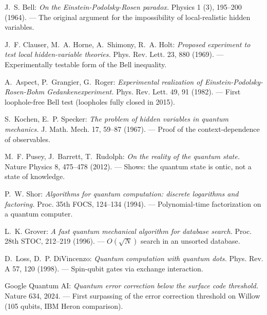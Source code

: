 \begin{description}[leftmargin=3.5em,style=sameline,itemsep=0.4em]\small

\item[Bell 1964] J.~S. Bell: \textit{On the Einstein-Podolsky-Rosen
  paradox.} Physics 1 (3), 195–200 (1964). — The original argument
  for the impossibility of local-realistic hidden variables.

\item[CHSH 1969] J.~F. Clauser, M.~A. Horne, A.~Shimony, R.~A. Holt:
  \textit{Proposed experiment to test local hidden-variable theories.}
  Phys. Rev. Lett. 23, 880 (1969). — Experimentally testable form of the
  Bell inequality.

\item[Aspect 1982] A.~Aspect, P.~Grangier, G.~Roger: \textit{Experimental
  realization of Einstein-Podolsky-Rosen-Bohm Gedankenexperiment.}
  Phys. Rev. Lett. 49, 91 (1982). — First loophole-free
  Bell test (loopholes fully closed in 2015).

\item[Kochen/Specker 1967] S.~Kochen, E.~P. Specker: \textit{The
  problem of hidden variables in quantum mechanics.} J. Math. Mech.
  17, 59–87 (1967). — Proof of the context-dependence of observables.

\item[PBR 2012] M.~F. Pusey, J.~Barrett, T.~Rudolph: \textit{On the
  reality of the quantum state.} Nature Physics 8, 475–478 (2012). —
  Shows: the quantum state is ontic, not a state of knowledge.

\item[Shor 1994] P.~W. Shor: \textit{Algorithms for quantum computation:
  discrete logarithms and factoring.} Proc. 35th FOCS, 124–134 (1994). —
  Polynomial-time factorization on a quantum computer.

\item[Grover 1996] L.~K. Grover: \textit{A fast quantum mechanical
  algorithm for database search.} Proc. 28th STOC, 212–219 (1996). —
  $O(\sqrt N)$ search in an unsorted database.

\item[Loss/DiVincenzo 1998] D.~Loss, D.~P. DiVincenzo: \textit{Quantum
  computation with quantum dots.} Phys. Rev. A 57, 120 (1998). —
  Spin-qubit gates via exchange interaction.

\item[Willow 2024] Google Quantum AI: \textit{Quantum error correction
  below the surface code threshold.} Nature 634, 2024. — First
  surpassing of the error correction threshold on Willow
  (105 qubits, IBM Heron comparison).


\end{description}
